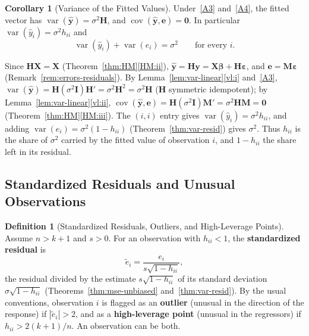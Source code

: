 \documentclass[12pt,a4paper]{article}
\makeatletter
\theoremstyle{definition}
\newtheorem{definition}[theorem]{Definition}
\newtheorem{corollary}[theorem]{Corollary}
\renewenvironment{proof}[1][\proofname]{\par
  \pushQED{\qed}%
  \normalfont \topsep6\p@\@plus6\p@\relax
  \trivlist
  \item[\hskip\labelsep\bfseries #1\@addpunct{.}]\ignorespaces
}{%
  \popQED\endtrivlist\@endpefalse
}
\DeclareMathOperator\var{var}
\DeclareMathOperator\cov{cov}
\newcommand{\bX}{\mathbf{X}}
\newcommand{\by}{\mathbf{y}}
\def\bb{\boldsymbol{\beta}}
\newcommand{\be}{\boldsymbol{\varepsilon}}
\newcommand{\bI}{\mathbf{I}}
\newcommand{\bH}{\mathbf{H}}
\newcommand{\bM}{\mathbf{M}}
\newcommand{\bzero}{\mathbf{0}}
\makeatother
\begin{document}
\begin{corollary}[Variance of the Fitted Values]\label{cor:var-fitted}
Under~\ref{A3} and~\ref{A4}, the fitted vector has $\var(\hat{\by}) = \sigma^2\bH$, and $\cov(\hat{\by}, \mathbf{e}) = \bzero$. In particular $\var(\hat{y}_i) = \sigma^2h_{ii}$ and
\[
\var(\hat{y}_i) + \var(e_i) = \sigma^2 \qquad \text{for every } i.
\]
\end{corollary}

\begin{proof}
Since $\bH\bX = \bX$ (Theorem~\ref{thm:HM}\ref{HM:ii}), $\hat{\by} = \bH\by = \bX\bb + \bH\be$, and $\mathbf{e} = \bM\be$ (Remark~\ref{rem:errors-residuals}). By Lemma~\ref{lem:var-linear}\ref{vl:i} and~\ref{A3}, $\var(\hat{\by}) = \bH(\sigma^2\bI)\bH' = \sigma^2\bH^2 = \sigma^2\bH$ ($\bH$ symmetric idempotent); by Lemma~\ref{lem:var-linear}\ref{vl:ii}, $\cov(\hat{\by}, \mathbf{e}) = \bH(\sigma^2\bI)\bM' = \sigma^2\bH\bM = \bzero$ (Theorem~\ref{thm:HM}\ref{HM:iii}). The $(i,i)$ entry gives $\var(\hat{y}_i) = \sigma^2h_{ii}$, and adding $\var(e_i) = \sigma^2(1 - h_{ii})$ (Theorem~\ref{thm:var-resid}) gives $\sigma^2$. Thus $h_{ii}$ is the share of $\sigma^2$ carried by the fitted value of observation $i$, and $1 - h_{ii}$ the share left in its residual.
\end{proof}

\subsection{Standardized Residuals and Unusual Observations}

\begin{definition}[Standardized Residuals, Outliers, and High-Leverage Points]\label{def:std-resid}
Assume $n > k + 1$ and $s > 0$. For an observation with $h_{ii} < 1$, the \textbf{standardized residual} is
\[
\tilde e_i = \frac{e_i}{s\sqrt{1 - h_{ii}}},
\]
the residual divided by the estimate $s\sqrt{1 - h_{ii}}$ of its standard deviation $\sigma\sqrt{1 - h_{ii}}$ (Theorems~\ref{thm:mse-unbiased} and~\ref{thm:var-resid}). By the usual conventions, observation $i$ is flagged as an \textbf{outlier} (unusual in the direction of the response) if $|\tilde e_i| > 2$, and as a \textbf{high-leverage point} (unusual in the regressors) if $h_{ii} > 2(k+1)/n$. An observation can be both.
\end{definition}
\end{document}
